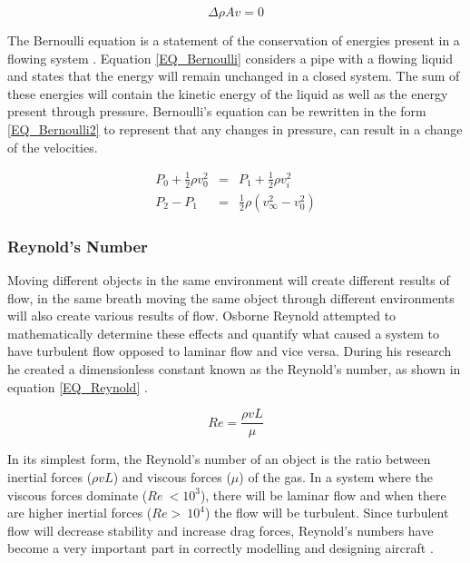 		\begin{equation}
		\label{EQ_BernoulliP}
		\Delta \rho Av = 0
		\end{equation} 
		
		The Bernoulli equation is a statement of the conservation of energies present in a flowing system \cite{Dayle}. Equation \ref{EQ_Bernoulli} considers a pipe with a flowing liquid and states that the energy will remain unchanged in a closed system. The sum of these energies will contain the kinetic energy of the liquid as well as the energy present through pressure. Bernoulli's equation can be rewritten in the form \eqref{EQ_Bernoulli2} to represent that any changes in pressure, can result in a change of the velocities.
		
		\begin{eqnarray}
		P_0 + \frac{1}{2} \rho v_0^2 &=& P_1 + \frac{1}{2} \rho v_i^2\label{EQ_Bernoulli}\\
		P_2 - P_1 &=& \frac{1}{2} \rho (v_\infty^2 - v_0^2)\label{EQ_Bernoulli2}
		\end{eqnarray}

		\subsubsection{Reynold's Number}
		Moving different objects in the same environment will create different results of flow, in the same breath moving the same object through different environments will also create various results of flow. Osborne Reynold attempted to mathematically determine these effects and quantify what caused a system to have turbulent flow opposed to laminar flow and vice versa. During his research he created a dimensionless constant known as the Reynold's number, as shown in equation \ref{EQ_Reynold} \cite{Reynold}. 
		
		\begin{equation}
		\label{EQ_Reynold}
		Re = \frac{\rho v L}{\mu}
		\end{equation} 
		
		In its simplest form, the Reynold's number of an object is the ratio between inertial forces ($\rho v L$) and viscous forces ($\mu$) of the gas. In a system where the viscous forces dominate ($Re ~< 10^3$), there will be laminar flow and when there are higher inertial forces ($Re >~ 10^4$) the flow will be turbulent. 
		Since turbulent flow will decrease stability and increase drag forces, Reynold's numbers have become a very important part in correctly modelling and designing aircraft \cite{Reynold}.

